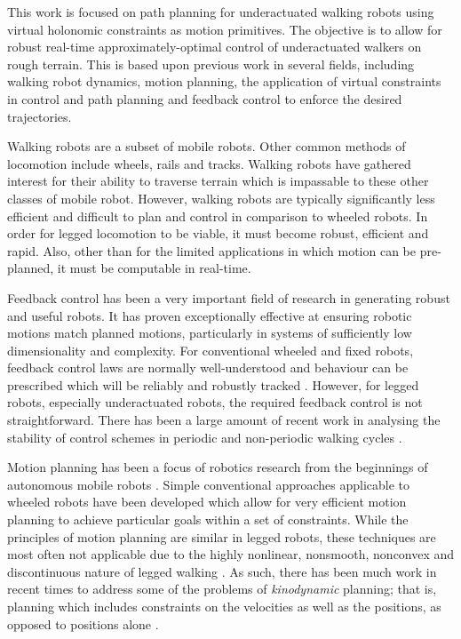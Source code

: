 This work is focused on path planning for underactuated walking robots using virtual holonomic constraints as motion primitives. The objective is to allow for robust real-time approximately-optimal control of underactuated walkers on rough terrain. This is based upon previous work in several fields, including walking robot dynamics, motion planning, the application of virtual constraints in control and path planning and feedback control to enforce the desired trajectories.

Walking robots are a subset of mobile robots. Other common methods of locomotion include wheels, rails and tracks. Walking robots have gathered interest for their ability to traverse terrain which is impassable to these other classes of mobile robot. However, walking robots are typically significantly less efficient and difficult to plan and control in comparison to wheeled robots. In order for legged locomotion to be viable, it must become robust, efficient and rapid. Also, other than for the limited applications in which motion can be pre-planned, it must be computable in real-time.

Feedback control has been a very important field of research in generating robust and useful robots. It has proven exceptionally effective at ensuring robotic motions match planned motions, particularly in systems of sufficiently low dimensionality and complexity. For conventional wheeled and fixed robots, feedback control laws are normally well-understood and behaviour can be prescribed which will be reliably and robustly tracked \cite{rivera1986internal}. However, for legged robots, especially underactuated robots, the required feedback control is not straightforward. There has been a large amount of recent work in analysing the stability of control schemes in periodic and non-periodic walking cycles \cite{shiriaev2005constructive, canudas2004concept, sreenath2011compliant}.

Motion planning has been a focus of robotics research from the beginnings of autonomous mobile robots \cite{georgeff1987reactive}. Simple conventional approaches applicable to wheeled robots have been developed which allow for very efficient motion planning to achieve particular goals within a set of constraints. While the principles of motion planning are similar in legged robots, these techniques are most often not applicable due to the highly nonlinear, nonsmooth, nonconvex and discontinuous nature of legged walking \cite{manchester13planning}. As such, there has been much work in recent times to address some of the problems of \textit{kinodynamic} planning; that is, planning which includes constraints on the velocities as well as the positions, as opposed to positions alone \cite{lavalle2001randomized, manchester13planning}.

